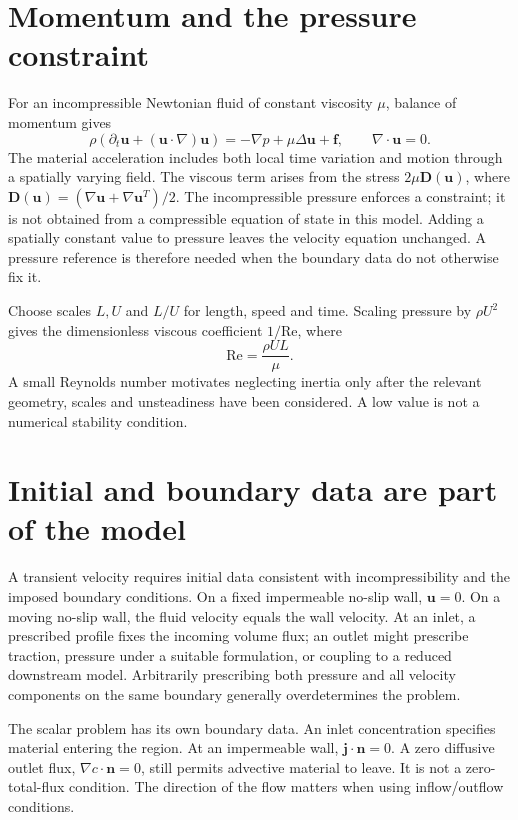 \documentclass[11pt,letterpaper]{article}
\theoremstyle{definition}\newtheorem{definition}{Definition}\newtheorem{example}{Example}
\numberwithin{equation}{section}
\begin{document}
\section{Momentum and the pressure constraint}
For an incompressible Newtonian fluid of constant viscosity $\mu$, balance of momentum gives
\begin{equation}\rho\left(\partial_t\boldsymbol u+(\boldsymbol u\cdot\nabla)\boldsymbol u\right)
=-\nabla p+\mu\Delta\boldsymbol u+\boldsymbol f,
\qquad \nabla\cdot\boldsymbol u=0.\end{equation}
The material acceleration includes both local time variation and motion through a spatially varying field. The viscous term arises from the stress $2\mu\boldsymbol D(\boldsymbol u)$, where
$\boldsymbol D(\boldsymbol u)=(\nabla\boldsymbol u+\nabla\boldsymbol u^{T})/2$.
The incompressible pressure enforces a constraint; it is not obtained from a compressible equation of state in this model. Adding a spatially constant value to pressure leaves the velocity equation unchanged. A pressure reference is therefore needed when the boundary data do not otherwise fix it.

Choose scales $L,U$ and $L/U$ for length, speed and time. Scaling pressure by $\rho U^2$ gives the dimensionless viscous coefficient $1/\mathrm{Re}$, where
\[\mathrm{Re}=\frac{\rho UL}{\mu}.\]
A small Reynolds number motivates neglecting inertia only after the relevant geometry, scales and unsteadiness have been considered. A low value is not a numerical stability condition.

\section{Initial and boundary data are part of the model}
A transient velocity requires initial data consistent with incompressibility and the imposed boundary conditions. On a fixed impermeable no-slip wall, $\boldsymbol u=0$. On a moving no-slip wall, the fluid velocity equals the wall velocity. At an inlet, a prescribed profile fixes the incoming volume flux; an outlet might prescribe traction, pressure under a suitable formulation, or coupling to a reduced downstream model. Arbitrarily prescribing both pressure and all velocity components on the same boundary generally overdetermines the problem.

The scalar problem has its own boundary data. An inlet concentration specifies material entering the region. At an impermeable wall, $\boldsymbol j\cdot\boldsymbol n=0$. A zero diffusive outlet flux, $\nabla c\cdot\boldsymbol n=0$, still permits advective material to leave. It is not a zero-total-flux condition. The direction of the flow matters when using inflow/outflow conditions.
\end{document}
